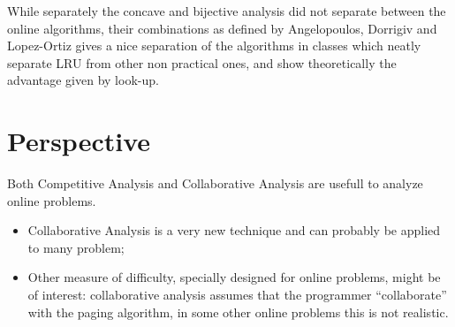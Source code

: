 While separately the concave and bijective analysis did not separate
between the online algorithms, their combinations as defined by
Angelopoulos, Dorrigiv and Lopez-Ortiz gives a nice separation of the
algorithms in classes which neatly separate LRU from other non
practical ones, and show theoretically the advantage given by look-up.



\section{Perspective}
\label{sec:perspective-online-problems}

Both Competitive Analysis and Collaborative Analysis are usefull to
analyze online problems. 
%
\begin{itemize}
\item Collaborative Analysis is a very new technique and can probably
  be applied to many problem;
\item Other measure of difficulty, specially designed for online
  problems, might be of interest: collaborative analysis assumes that
  the programmer ``collaborate'' with the paging algorithm, in some
  other online problems this is not realistic.
\end{itemize}


